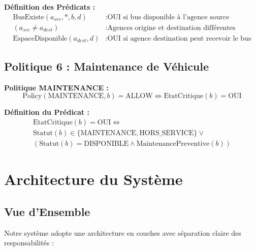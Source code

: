 \documentclass[12pt,a4paper]{article}
\begin{document}
    \textbf{Définition des Prédicats :}
    \begin{align}
        \text{BusExiste}(a_{src}, *, b, d) &: \text{OUI si bus disponible à l'agence source} \\
        (a_{src} \neq a_{dest}) &: \text{Agences origine et destination différentes} \\
        \text{EspaceDisponible}(a_{dest}, d) &: \text{OUI si agence destination peut recevoir le bus}
    \end{align}

    \subsection{Politique 6 : Maintenance de Véhicule}

    \begin{definitionbox}
        \textbf{Politique MAINTENANCE :}
        \begin{equation}
            \text{Policy}(\text{MAINTENANCE}, b) = \text{ALLOW} \Leftrightarrow \text{EtatCritique}(b) = \text{OUI}
        \end{equation}
    \end{definitionbox}

    \textbf{Définition du Prédicat :}
    \begin{multline}
        \text{EtatCritique}(b) = \text{OUI} \Leftrightarrow \\
        \text{Statut}(b) \in \{\text{MAINTENANCE}, \text{HORS\_SERVICE}\} \vee \\
        (\text{Statut}(b) = \text{DISPONIBLE} \wedge \text{MaintenancePreventive}(b))
    \end{multline}

    \newpage

    \section{Architecture du Système}

    \subsection{Vue d'Ensemble}

    Notre système adopte une architecture en couches avec séparation claire des responsabilités :
\end{document}
